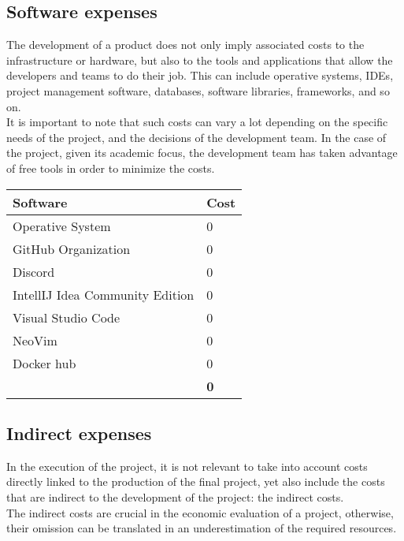 \documentclass[../memory.tex]{subfiles}
\begin{document}
\subsection{Software expenses}
The development of a product does not only imply associated costs to the
infrastructure or hardware, but also to the tools and applications that allow
the developers and teams to do their job. This can include operative systems,
IDEs, project management software, databases, software libraries, frameworks,
and so on.
\\
It is important to note that such costs can vary a lot depending on the specific
needs of the project, and the decisions of the development team. In the case of
the project, given its academic focus, the development team has taken advantage
of free tools in order to minimize the costs.
\\[12pt]
\begin{tabularx}{\textwidth}{|X|X|}
	\hline
	\rowcolor{rowColor}
	Software                        & Cost                \\
	\hline
	Operative System                & 0\texteuro          \\
	\hline
	GitHub Organization             & 0\texteuro          \\
	\hline
	Discord                         & 0\texteuro          \\
	\hline
	IntellIJ Idea Community Edition & 0\texteuro          \\
	\hline
	Visual Studio Code              & 0\texteuro          \\
	\hline
	NeoVim                          & 0\texteuro          \\
	\hline
	Docker hub                      & 0\texteuro          \\
	\hline
	\multicolumn{1}{X|}{}           & \textbf{0\texteuro} \\
	\cline{2-2}
\end{tabularx}
\subsection{Indirect expenses}
In the execution of the project, it is not relevant to take into account costs
directly linked to the production of the final project, yet also include the
costs that are indirect to the development of the project: the indirect costs.
\\[8pt]
The indirect costs are crucial in the economic evaluation of a project,
otherwise, their omission can be translated in an underestimation of the
required resources.
\end{document}
